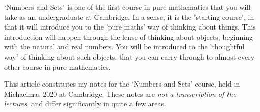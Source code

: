 



	

	`Numbers and Sets' is one of the first course in pure mathematics that you will take as an undergraduate at Cambridge. In a sense, it is the 'starting course', in that it will introduce you to the 'pure maths' way of thinking about things. This introduction will happen through the lense of thinking about objects, beginning with the natural and real numbers. You will be introduced to the 'thoughtful way' of thinking about such objects, that you can carry through to almost every other course in pure mathematics.

	This article constitutes my notes for the `Numbers and Sets' course, held in Michaelmas 2020 at Cambridge. These notes are \emph{not a transcription of the lectures}, and differ significantly in quite a few areas.









